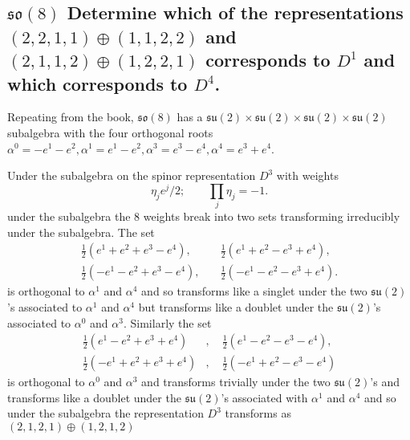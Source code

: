 \documentclass[main.tex]{subfiles}
\begin{document}
\subsection{$\mathfrak{so}(8)$ Determine which of the representations $(2,2,1,1)\oplus(1,1,2,2)$ and $(2,1,1,2)\oplus(1,2,2,1)$ corresponds to $D^1$ and which corresponds to $D^4$.}
Repeating from the book, $\mathfrak{so}(8)$ has a $\mathfrak{su}(2)\times\mathfrak{su}(2)\times\mathfrak{su}(2)\times\mathfrak{su}(2)$ subalgebra with the four orthogonal roots $\alpha^0=-e^1-e^2,\alpha^1=e^1-e^2,\alpha^3=e^3-e^4,\alpha^4=e^3+e^4$. 

Under the subalgebra on the spinor representation $D^3$ with weights 
\begin{equation}
\eta_je^j/2;\qquad\prod_{j}\eta_j=-1.
\end{equation}
under the subalgebra the 8 weights break into two sets transforming irreducibly under the subalgebra. The set
\begin{equation}\label{eq:set1D3}
\begin{split}
\frac{1}{2}(e^1+e^2+e^3-e^4),&\quad\frac{1}{2}(e^1+e^2-e^3+e^4),\\\frac{1}{2}(-e^1-e^2+e^3-e^4),&\quad\frac{1}{2}(-e^1-e^2-e^3+e^4).
\end{split}
\end{equation}
is orthogonal to $\alpha^1$ and $\alpha^4$ and so transforms like a singlet under the two $\mathfrak{su}(2)$'s associated to $\alpha^1$ and $\alpha^4$ but transforms like a doublet under the $\mathfrak{su}(2)$'s associated to $\alpha^0$ and $\alpha^3$.
Similarly the set
\begin{equation}\label{eq:set2D3}
\begin{split}
\frac{1}{2}(e^1-e^2+e^3+e^4)&,\quad\frac{1}{2}(e^1-e^2-e^3-e^4),\\\frac{1}{2}(-e^1+e^2+e^3+e^4)&,\quad\frac{1}{2}(-e^1+e^2-e^3-e^4)
\end{split}
\end{equation}
is orthogonal to $\alpha^0$ and $\alpha^3$ and transforms trivially under the two $\mathfrak{su}(2)$'s and transforms like a doublet under the $\mathfrak{su}(2)$'s associated with $\alpha^1$ and $\alpha^4$ and so under the subalgebra the representation $D^3$ transforms as $(2,1,2,1)\oplus(1,2,1,2)$
\end{document}
